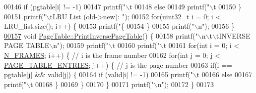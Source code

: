 \begin{DoxyCode}
{{{{{{{{{{00146         \textcolor{keywordflow}{if} (pgtable[i] != -1)
00147              printf(\textcolor{stringliteral}{"\(\backslash\)t%
00148         \textcolor{keywordflow}{else}
00149             printf(\textcolor{stringliteral}{"\(\backslash\)t%
00150     \}
00151     printf(\textcolor{stringliteral}{"\(\backslash\)tLRU List (old->new): "});
00152     \textcolor{keywordflow}{for}(uint32\_t i = 0; i < LRU\_list.size(); i++) \{
00153         printf(\textcolor{stringliteral}{"\{%
00154     \}
00155     printf(\textcolor{stringliteral}{"\(\backslash\)n"});
00156 \}
\hypertarget{memory_8cpp_source.tex_l00157}{}\hyperlink{classPageTable_a8b7ab1d3a811eabd0e2862bc9a4ae1f7}{00157} \textcolor{keywordtype}{void} \hyperlink{classPageTable_a8b7ab1d3a811eabd0e2862bc9a4ae1f7}{PageTable::PrintInversePageTable}() \{
00158     printf(\textcolor{stringliteral}{"\(\backslash\)n\(\backslash\)t\(\backslash\)tINVERSE PAGE TABLE\(\backslash\)n"});
00159     printf(\textcolor{stringliteral}{"\(\backslash\)t%
00160     printf(\textcolor{stringliteral}{"\(\backslash\)t%
00161     \textcolor{keywordflow}{for}(\textcolor{keywordtype}{int} i = 0; i < \hyperlink{memory_8h_a0b0ce802de0cae773522024d7626b007}{N\_FRAMES}; i++) \{ \textcolor{comment}{// i is the frame number}
00162         \textcolor{keywordflow}{for}(\textcolor{keywordtype}{int} j = 0; j < \hyperlink{memory_8h_a6fc2e8cefe03a42d0a238bad856a2a8b}{PAGE\_TABLE\_ENTRIES}; j++) \{ \textcolor{comment}{// j is the page number}
00163             \textcolor{keywordflow}{if}(i == pgtable[j] && valid[j]) \{
00164                 \textcolor{keywordflow}{if} (valid[i] != -1)
00165                      printf(\textcolor{stringliteral}{"\(\backslash\)t%
00166                 \textcolor{keywordflow}{else}
00167                     printf(\textcolor{stringliteral}{"\(\backslash\)t%
00168             \}
00169         \}
00170     \}
00171     printf(\textcolor{stringliteral}{"\(\backslash\)n"});    
00172 \}
00173 
}}}}}}}}}}}}}}}}}
\end{DoxyCode}
